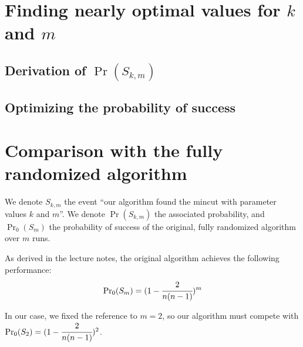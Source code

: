 \providecommand{\f}[2]{\ensuremath{\cfrac{#1}{#2}}}

\section{Finding nearly optimal values for $k$ and $m$}
  \subsection{Derivation of $\Pr(S_{k, m})$}


  \subsection{Optimizing the probability of success}


\section{Comparison with the fully randomized algorithm}
  We denote $S_{k, m}$ the event ``our algorithm found the mincut with parameter values $k$ and $m$''. We denote $\Pr(S_{k, m})$ the associated probability, and $\Pr_0(S_m)$ the probability of success of the original, fully randomized algorithm over $m$ runs.

  \noindent
  As derived in the lecture notes, the original algorithm achieves the following performance:
  \[
    {\Pr}_0(S_m) = (1 - \f{2}{n(n-1)})^m
  \]

  \noindent
  In our case, we fixed the reference to $m = 2$, so our algorithm must compete with $\Pr_0(S_2) = (1 - \f{2}{n(n-1)})^2$.

